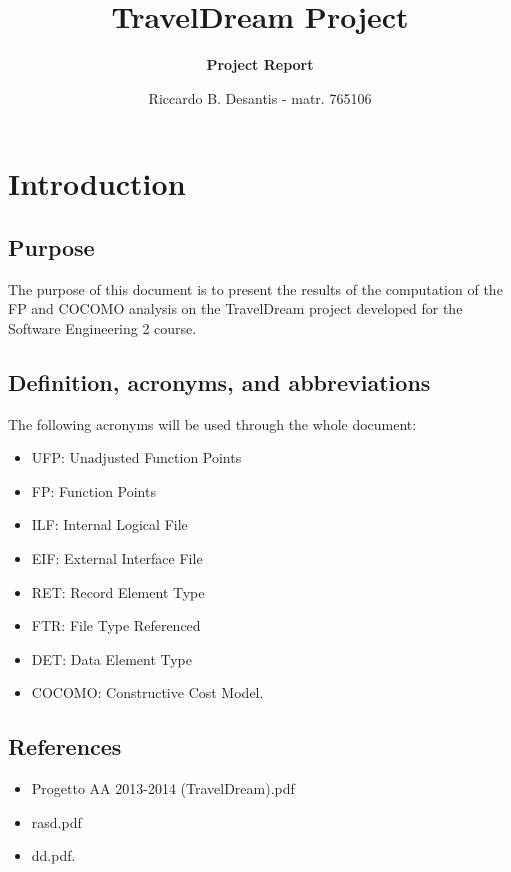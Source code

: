 \documentclass[a4paper,12pt]{book}
\begin{document}
\title{\textbf{TravelDream Project}}
\author{\textbf{Project Report}}
\date{Riccardo B. Desantis - matr. 765106}

\maketitle

\tableofcontents

\chapter{Introduction}

\section{Purpose}
The purpose of this document is to present the results of the computation of the FP and COCOMO analysis on the TravelDream project developed for the Software Engineering 2 course.

\section{Definition, acronyms, and abbreviations}
The following acronyms will be used through the whole document:
\begin{itemize}
  \item UFP: Unadjusted Function Points
  \item FP: Function Points
  \item ILF: Internal Logical File
  \item EIF: External Interface File
  \item RET: Record Element Type
  \item FTR: File Type Referenced
  \item DET: Data Element Type
  \item COCOMO: Constructive Cost Model.
\end{itemize}

\section{References}
\begin{itemize}
  \item Progetto AA 2013-2014 (TravelDream).pdf
  \item rasd.pdf
  \item dd.pdf.
\end{itemize}
\end{document}
